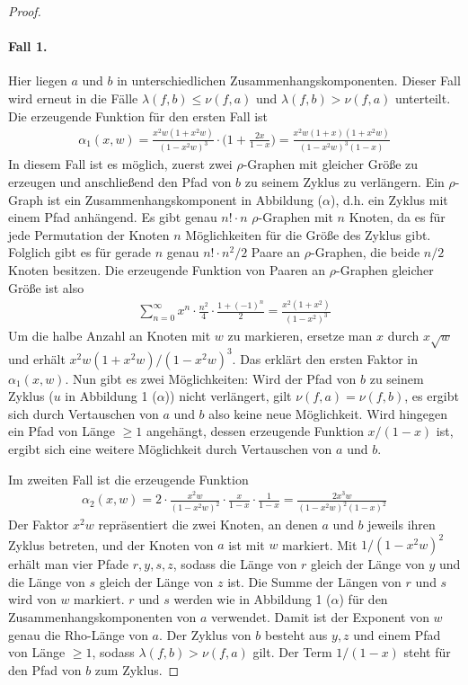 \documentclass[a4paper, 10pt, ngerman]{article}
\begin{document}
\begin{proof}
    \paragraph{Fall 1.} Hier liegen $a$ und $b$ in unterschiedlichen Zusammenhangskomponenten. Dieser Fall wird erneut in die Fälle $\lambda(f, b) \le \nu(f, a)$ und $\lambda(f, b) > \nu(f, a)$ unterteilt. Die erzeugende Funktion für den ersten Fall ist
    \begin{align*}
        \alpha_1(x, w) = \frac {x^2w(1 + x^2w)} {(1 - x^2w)^3} \cdot \Bigg (1 + \frac {2x} {1 - x} \Bigg ) = \frac {x^2w(1 + x)(1 + x^2w)} {(1 - x^2w)^3(1 - x)}
    \end{align*}
    In diesem Fall ist es möglich, zuerst zwei $\rho$-Graphen mit gleicher Größe zu erzeugen und anschließend den Pfad von $b$ zu seinem Zyklus zu verlängern. Ein $\rho$-Graph ist ein Zusammenhangskomponent in Abbildung ($\alpha$), d.h. ein Zyklus mit einem Pfad anhängend. Es gibt genau $n! \cdot n$ $\rho$-Graphen mit $n$ Knoten, da es für jede Permutation der Knoten $n$ Möglichkeiten für die Größe des Zyklus gibt. Folglich gibt es für gerade $n$ genau $n! \cdot n^2/2$ Paare an $\rho$-Graphen, die beide $n/2$ Knoten besitzen. Die erzeugende Funktion von Paaren an $\rho$-Graphen gleicher Größe ist also
    \begin{align*}
        \sum_{n = 0}^\infty x^n \cdot \frac {n^2} 4 \cdot \frac {1 + (-1)^n} 2 = \frac {x^2(1 + x^2)} {(1 - x^2)^3}
    \end{align*}
    Um die halbe Anzahl an Knoten mit $w$ zu markieren, ersetze man $x$ durch $x \sqrt w$ und erhält $x^2w(1 + x^2w) / (1 - x^2w)^3$. Das erklärt den ersten Faktor in $\alpha_1(x, w)$. Nun gibt es zwei Möglichkeiten: Wird der Pfad von $b$ zu seinem Zyklus ($u$ in Abbildung 1 ($\alpha$)) nicht verlängert, gilt $\nu(f, a) = \nu(f, b)$, es ergibt sich durch Vertauschen von $a$ und $b$ also keine neue Möglichkeit. Wird hingegen ein Pfad von Länge $\ge 1$ angehängt, dessen erzeugende Funktion $x/(1 - x)$ ist, ergibt sich eine weitere Möglichkeit durch Vertauschen von $a$ und $b$.

    \noindent Im zweiten Fall ist die erzeugende Funktion
    \begin{align*}
        \alpha_2(x, w) = 2 \cdot \frac {x^2w} {(1 - x^2w)^2} \cdot  \frac x {1 - x} \cdot \frac {1}{1 - x} = \frac {2x^3w} {(1 - x^2w)^2 (1 - x)^2}
    \end{align*}
    Der Faktor $x^2w$ repräsentiert die zwei Knoten, an denen $a$ und $b$ jeweils ihren Zyklus betreten, und der Knoten von $a$ ist mit $w$ markiert. Mit $1 / (1 - x^2w)^2$ erhält man vier Pfade $r, y, s, z$, sodass die Länge von $r$ gleich der Länge von $y$ und die Länge von $s$ gleich der Länge von $z$ ist. Die Summe der Längen von $r$ und $s$ wird von $w$ markiert. $r$ und $s$ werden wie in Abbildung 1 ($\alpha$) für den Zusammenhangskomponenten von $a$ verwendet. Damit ist der Exponent von $w$ genau die Rho-Länge von $a$. Der Zyklus von $b$ besteht aus $y, z$ und einem Pfad von Länge $\ge 1$, sodass $\lambda(f, b) > \nu(f, a)$ gilt. Der Term $1 / (1 - x)$ steht für den Pfad von $b$ zum Zyklus.


\end{proof}
\end{document}
